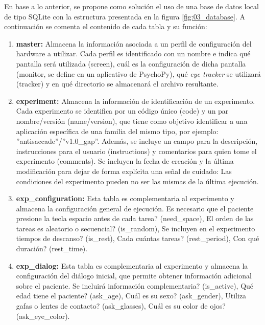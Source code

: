 \documentclass[\main/main.tex]{subfiles}
\begin{document}
			En base a lo anterior, se propone como solución el uso de una base de datos local de tipo SQLite con la estructura presentada en la figura \ref{fig:03_database}. A continuación se comenta el contenido de cada tabla y su función:
			\begin{enumerate}
				\item \textbf{master:} Almacena la información asociada a un perfil de configuración del hardware a utilizar. Cada perfil es identificado con un nombre e indica qué pantalla será utilizada (screen), cuál es la configuración de dicha pantalla (monitor, se define en un aplicativo de PsychoPy), qué \textit{eye tracker} se utilizará (tracker) y en qué directorio se almacenará el archivo resultante.

				\item \textbf{experiment:} Almacena la información de identificación de un experimento. Cada experimento se identifica por un código único (code) y un par nombre/versión (name/version), que tiene como objetivo identificar a una aplicación específica de una familia del mismo tipo, por ejemplo: ''antisaccade''/''v1.0\_gap''. Además, se incluye un campo para la descripción, instrucciones para el usuario (instructions) y comentarios para quien tome el experimento (comments). Se incluyen la fecha de creación y la última modificación para dejar de forma explícita una señal de cuidado: Las condiciones del experimento pueden no ser las mismas de la última ejecución.
				
				\item \textbf{exp\_configuration:} Esta tabla es complementaria al experimento y almacena la configuración general de ejecución. \textquestiondown Es necesario que el paciente presione la tecla espacio antes de cada tarea? (need\_space), \textquestiondown El orden de las tareas es aleatorio o secuencial? (is\_random), \textquestiondown Se incluyen en el experimento tiempos de descanso? (is\_rest), \textquestiondown Cada cuántas tareas? (rest\_period), \textquestiondown Con qué duración? (rest\_time).

				\item \textbf{exp\_dialog:} Esta tabla es complementaria al experimento y almacena la configuración del diálogo inicial, que permite obtener información adicional sobre el paciente. \textquestiondown Se incluirá información complementaria? (is\_active), \textquestiondown Qué edad tiene el paciente? (ask\_age), \textquestiondown Cuál es su sexo? (ask\_gender), \textquestiondown Utiliza gafas o lentes de contacto? (ask\_glasses), \textquestiondown Cuál es su color de ojos? (ask\_eye\_color).


\end{enumerate}
\end{document}
